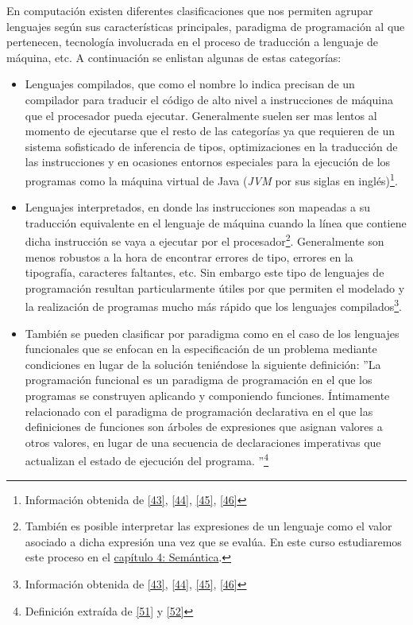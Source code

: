     En computación existen diferentes clasificaciones que nos permiten agrupar lenguajes según sus características principales, paradigma de programación al que pertenecen, tecnología involucrada en el proceso de traducción a lenguaje de máquina, etc. A continuación se enlistan algunas de estas categorías: 

    \begin{itemize}
        \item Lenguajes compilados,  que como el nombre lo indica precisan de un compilador para traducir el código de alto nivel a instrucciones de máquina que el procesador pueda ejecutar. Generalmente suelen ser mas lentos al momento de ejecutarse que el resto de las categorías  ya que requieren de un sistema sofisticado de inferencia de tipos, optimizaciones en la traducción de las instrucciones y en ocasiones entornos especiales para la ejecución de los programas como la máquina virtual de Java (\textit{JVM} por sus siglas en inglés)\footnote{Información obtenida de \hyperlink{43}{[43]}, \hyperlink{44}{[44]}, \hyperlink{45}{[45]}, \hyperlink{46}{[46]}}.\\

        \item Lenguajes interpretados, en donde las instrucciones son mapeadas a su traducción equivalente en el lenguaje de máquina cuando la línea que contiene dicha instrucción se vaya a ejecutar por el procesador\footnote{También es posible interpretar las expresiones de un lenguaje como el valor asociado a dicha expresión una vez que se evalúa. En este curso estudiaremos este proceso en el \hyperref[sec:semantics]{capítulo 4: Semántica}.}. Generalmente son menos robustos a la hora de encontrar errores de tipo, errores en la tipografía, caracteres faltantes, etc. Sin embargo este tipo de lenguajes de programación resultan particularmente útiles por que permiten el modelado y la realización de programas mucho más rápido que los lenguajes compilados\footnote{Información obtenida de \hyperlink{43}{[43]}, \hyperlink{44}{[44]}, \hyperlink{45}{[45]}, \hyperlink{46}{[46]}}.\\

        \item También se pueden clasificar por paradigma como en el caso de los lenguajes funcionales que se enfocan en la especificación de un problema mediante condiciones en lugar de la solución teniéndose la siguiente definición: 
         ''La programación funcional es un paradigma de programación en el que los programas se construyen aplicando y componiendo funciones. Íntimamente relacionado con el paradigma de programación declarativa en el que las definiciones de funciones son árboles de expresiones que asignan valores a otros valores, en lugar de una secuencia de declaraciones imperativas que actualizan el estado de ejecución del programa. ''\footnote{Definición extraída de \hyperlink{51}{[51]} y \hyperlink{52}{[52]}}\\


\end{itemize}
